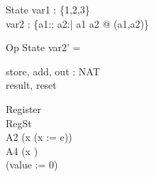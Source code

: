 \documentclass{llncs}
\begin{document}
\begin{schema}{State}
var1 : \power \{1,2,3\}\\
var2 : \{a1:\nat; a2:\nat | a1 \neq a2 @ (a1,a2)\}
\end{schema}
\begin{schema}{Op}
\Delta State
\where
var2' = \emptyset
\end{schema}


\begin{circus}
\circchannel store, add, out : NAT\\
\circchannel result, reset\\
\end{circus}
\begin{circus}
\circprocess Register \circdef\\
	\circbegin \circstate RegSt \\
	A2 \circdef (\circvar x \circspot (x := e)) \\
	A4 \circdef (\circvar x \circspot \Skip)\\
	\circspot (value := 0) \\
	\circend\\
\end{circus}
\end{document}

